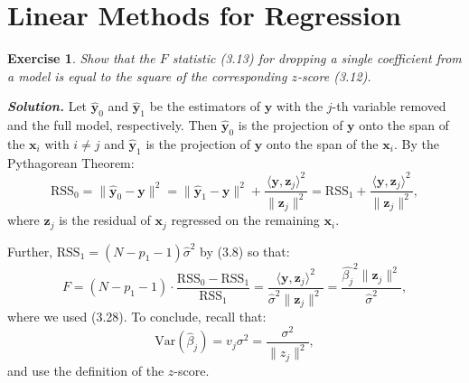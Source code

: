 \documentclass[12pt]{article}
\def\bx{\textbf{x}}
\def\bz{\textbf{z}}
\def\by{\textbf{y}}
\def\RSS{\text{RSS}}
\def\var{\text{Var}}
\newtheorem{exercise}{Exercise}[section]
\newenvironment{solution}[1][\it{Solution}]{\textbf{#1. } }{\vspace{.5cm}}
\begin{document}
\newpage
\section{Linear Methods for Regression}
\hrulefill
\vspace{.6cm}


\begin{exercise}
		Show that the $F$ statistic (3.13) for dropping a single coefficient
		from a model is equal to the square of the corresponding $z$-score (3.12).
\end{exercise}
\begin{solution}
	Let $\hat{\by}_0$ and $\hat{\by}_1$ be the estimators of $\by$ with the $j$-th variable removed and the full model, respectively. Then  $\hat{\by}_0$ is the projection of $\by$ onto the span of the $\bx_i$ with $i \neq j$ and $\hat{\by}_1$ is the projection of $\by$ onto the span of the $\bx_i$. By the Pythagorean Theorem:
	$$\RSS_0 = \|\hat{\by}_0 - \by\|^2 = \|\hat{\by}_1 - \by\|^2 + \frac{\langle \by, \bz_j\rangle^2}{\|\bz_j\|^2} = \RSS_1+ \frac{\langle \by, \bz_j\rangle^2}{\|\bz_j\|^2}, $$
	where $\bz_j$ is the residual of $\bx_j$ regressed on the remaining $\bx_i$. 
	
	Further, $\RSS_1 = (N-p_1 -1) \hat{\sigma}^2$ by (3.8) so that:
	$$F = (N - p_1 -1 )\cdot  \frac{\RSS_0-\RSS_1}{\RSS_1} = \frac{\langle \by, \bz_j\rangle^2}{\hat{\sigma}^2\|\bz_j\|^2} = \frac{\hat{\beta_j}^2 \|\bz_j\|^2}{\hat{\sigma}^2},$$
	where we used (3.28). To conclude, recall that:
 $$\var(\hat{\beta}_j) = v_j \sigma^2 = \frac{\sigma^2}{\|z_j\|^2},$$
 and use the definition of the $z$-score.
\end{solution} 
\end{document}
